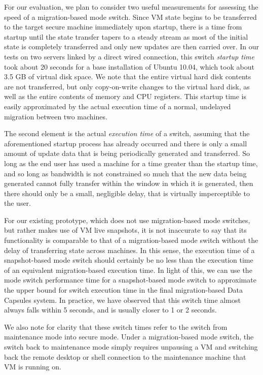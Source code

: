 \documentclass{acm_proc_article-sp}
\begin{document}
For our evaluation, we plan to consider two useful measurements for assessing
the speed of a migration-based mode switch.  Since VM state begins to be
transferred to the target secure machine immediately upon startup, there is a
time from startup until the state transfer tapers to a steady stream as most of
the initial state is completely transferred and only new updates are then
carried over.  In our tests on two servers linked by a direct wired connection,
this switch \emph{startup time} took about 20 seconds for a base installation of
Ubuntu 10.04, which took about 3.5 GB of virtual disk space.  We note that the
entire virtual hard disk contents are not transferred, but only copy-on-write
changes to the virtual hard disk, as well as the entire contents of memory and
CPU registers.  This startup time is easily approximated by the actual execution
time of a normal, undelayed migration between two machines.

The second element is the actual \emph{execution time} of a switch, assuming
that the aforementioned startup process has already occurred and there is only a
small amount of update data that is being periodically generated and
transferred.  So long as the end user has used a machine for a time greater than
the startup time, and so long as bandwidth is not constrained so much that the
new data being generated cannot fully transfer within the window in which it is
generated, then there should only be a small, negligible delay, that is
virtually imperceptible to the user.

For our existing prototype, which does not use migration-based mode switches,
but rather makes use of VM live snapshots, it is not inaccurate to say that its
functionality is comparable to that of a migration-based mode switch without the
delay of transferring state across machines.  In this sense, the execution time
of a snapshot-based mode switch should certainly be no less than the execution
time of an equivalent migration-based execution time.  In light of this, we can
use the mode switch performance time for a snapshot-based mode switch to
approximate the upper bound for switch execution time in the final
migration-based Data Capsules system.  In practice, we have observed that this
switch time almost always falls within 5 seconds, and is usually closer to 1 or
2 seconds.

We also note for clarity that these switch times refer to the switch from
maintenance mode into secure mode.  Under a migration-based mode switch, the
switch back to maintenance mode simply requires unpausing a VM and switching
back the remote desktop or shell connection to the maintenance machine that VM
is running on.
\end{document}
